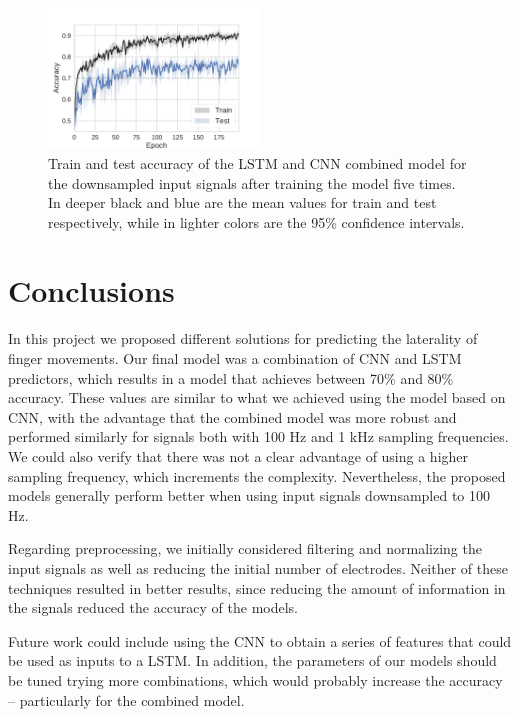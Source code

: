 \documentclass[10pt,conference,compsocconf]{IEEEtran}
\begin{document}
        \begin{figure}[t]
            \centering
            \includegraphics[width=0.5\textwidth]{figures/traintestcomb.pdf}
            \caption{Train and test accuracy of the LSTM and CNN combined model for the downsampled input signals after training the model five times. In deeper black and blue are the mean values for train and test respectively, while in lighter colors are the 95\% confidence intervals.}
            \label{fig:traintestcomb}
        \end{figure}


\section{Conclusions} %
\label{sec:conclusions}
    In this project we proposed different solutions for predicting the laterality of finger movements. Our final model was a combination of CNN and LSTM predictors, which results in a model that achieves between 70\% and 80\% accuracy. These values are similar to what we achieved using the model based on CNN, with the advantage that the combined model was more robust and performed similarly for signals both with 100 Hz and 1 kHz sampling frequencies. We could also verify that there was not a clear advantage of using a higher sampling frequency, which increments the complexity. Nevertheless, the proposed models generally perform better when using input signals downsampled to 100 Hz.
    
    Regarding preprocessing, we initially considered filtering and normalizing the input signals as well as reducing the initial number of electrodes. Neither of these techniques resulted in better results, since reducing the amount of information in the signals reduced the accuracy of the models.
    
    	
	Future work could include using the CNN to obtain a series of features that could be used as inputs to a LSTM. In addition, the parameters of our models should be tuned trying more combinations, which would probably increase the accuracy -- particularly for the combined model.
        



\end{document}
